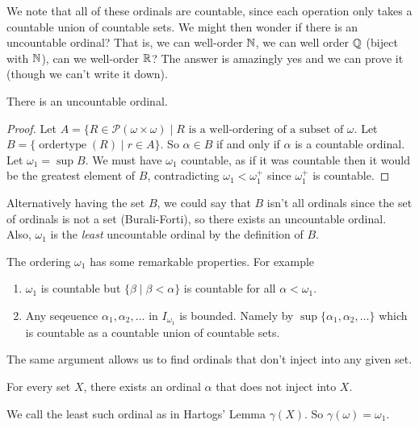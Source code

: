 \documentclass[a4paper]{scrartcl}
\begin{document}
We note that all of these ordinals are countable, since each operation only takes a countable union of countable sets. We might then wonder if there is an uncountable ordinal? That is, we can well-order $\mathbb{N}$, we can well order $\mathbb{Q}$ (biject with $\mathbb{N}$), can we well-order $\mathbb{R}$? The answer is amazingly yes and we can prove it (though we can't write it down).

\begin{theorem}
  There is an uncountable ordinal.
\end{theorem}
\begin{proof}
  Let $A = \{R \in \mathcal{P}(\omega \times \omega) \mid \text{$R$ is a well-ordering of a subset of $\omega$}$. Let $B = \{\operatorname{ordertype}(R) \mid r \in A\}$. So $\alpha \in B$ if and only if $\alpha$ is a countable ordinal. Let $\omega_1 = \sup B$. We must have $\omega_1$ countable, as if it was countable then it would be the greatest element of $B$, contradicting $\omega_1 < \omega_1^+$ since $\omega_1^+$ is countable.
\end{proof}

\begin{remark}
  Alternatively having the set $B$, we could say that $B$ isn't all ordinals since the set of ordinals is not a set (Burali-Forti), so there exists an uncountable ordinal. Also, $\omega_1$ is the \emph{least} uncountable ordinal by the definition of $B$.
\end{remark}

The ordering $\omega_1$ has some remarkable properties. For example
\begin{enumerate}
  \item $\omega_1$ is countable but $\{\beta \mid \beta < \alpha\}$ is countable for all $\alpha < \omega_1$.
  \item Any seqeuence $\alpha_1, \alpha_2, \dots$ in $I_{\omega_1}$ is bounded. Namely by $\sup\{\alpha_1, \alpha_2, \dots\}$ which is countable as a countable union of countable sets.
\end{enumerate}

The same argument allows us to find ordinals that don't inject into any given set.
\begin{theorem}
  For every set $X$, there exists an ordinal $\alpha$ that does not inject into $X$.
\end{theorem}

We call the least such ordinal as in Hartogs' Lemma $\gamma(X)$. So $\gamma(\omega) = \omega_1$.
\end{document}

